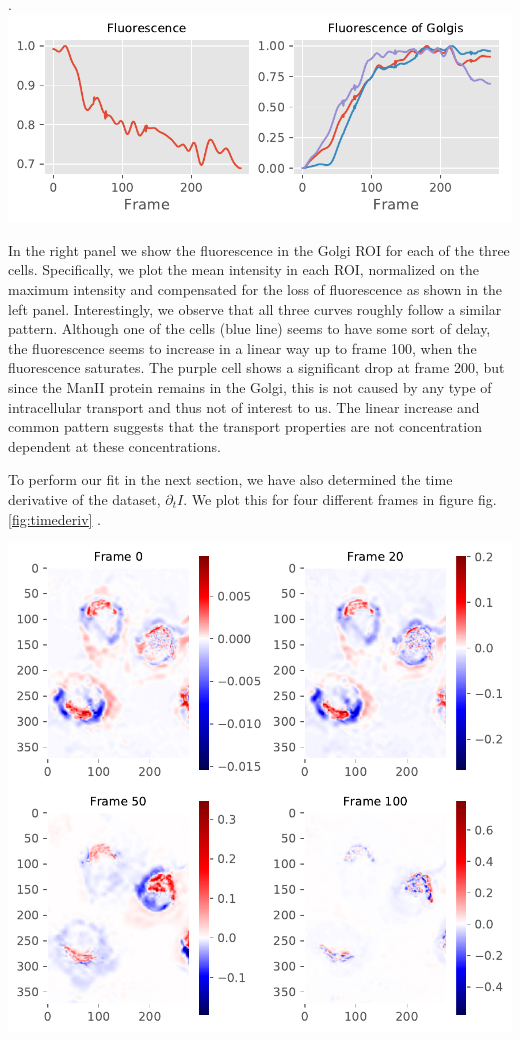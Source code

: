 \documentclass[12pt,a4paper,]{Dissertate}
\let\origfigure\figure
\let\endorigfigure\endfigure
\renewenvironment{figure}[1][2] {
    \expandafter\origfigure\expandafter[H]
} {
    \endorigfigure
}
\begin{document}
.\includegraphics{source/figures/pdf/general_fluorescence.pdf}

In the right panel we show the fluorescence in the Golgi ROI for each of
the three cells. Specifically, we plot the mean intensity in each ROI,
normalized on the maximum intensity and compensated for the loss of
fluorescence as shown in the left panel. Interestingly, we observe that
all three curves roughly follow a similar pattern. Although one of the
cells (blue line) seems to have some sort of delay, the fluorescence
seems to increase in a linear way up to frame 100, when the fluorescence
saturates. The purple cell shows a significant drop at frame 200, but
since the ManII protein remains in the Golgi, this is not caused by any
type of intracellular transport and thus not of interest to us. The
linear increase and common pattern suggests that the transport
properties are not concentration dependent at these concentrations.

To perform our fit in the next section, we have also determined the time
derivative of the dataset, \(\partial_tI\). We plot this for four
different frames in figure fig.\ref{fig:timederiv} .

\begin{figure}
\hypertarget{fig:timederiv}{%
\centering
\includegraphics{source/figures/pdf/time_deriv.pdf}
\caption{The determined time derivative four different frames of the
ManII RUSH experiments.}\label{fig:timederiv}
}
\end{figure}
\end{document}
